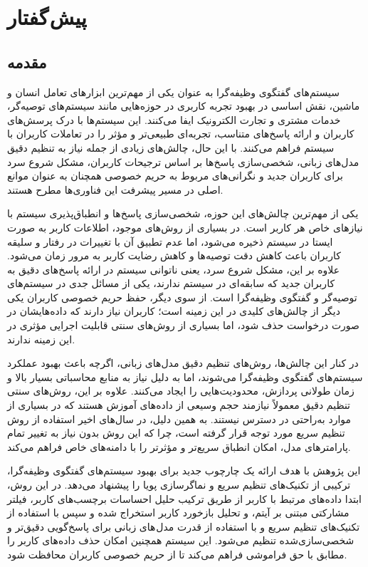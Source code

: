 
\chapter{پیش گفتار}

\section{مقدمه}

سیستم‌های گفتگوی وظیفه‌گرا به عنوان یکی از مهم‌ترین ابزارهای تعامل انسان و ماشین، نقش اساسی در بهبود تجربه کاربری در حوزه‌هایی مانند سیستم‌های توصیه‌گر، خدمات مشتری و تجارت الکترونیک ایفا می‌کنند. این سیستم‌ها با درک پرسش‌های کاربران و ارائه پاسخ‌های متناسب، تجربه‌ای طبیعی‌تر و مؤثر را در تعاملات کاربران با سیستم فراهم می‌کنند. با این حال، چالش‌های زیادی از جمله نیاز به تنظیم دقیق مدل‌های زبانی، شخصی‌سازی پاسخ‌ها بر اساس ترجیحات کاربران، مشکل شروع سرد برای کاربران جدید و نگرانی‌های مربوط به حریم خصوصی همچنان به عنوان موانع اصلی در مسیر پیشرفت این فناوری‌ها مطرح هستند.  

یکی از مهم‌ترین چالش‌های این حوزه، شخصی‌سازی پاسخ‌ها و انطباق‌پذیری سیستم با نیازهای خاص هر کاربر است. در بسیاری از روش‌های موجود، اطلاعات کاربر به صورت ایستا در سیستم ذخیره می‌شود، اما عدم تطبیق آن با تغییرات در رفتار و سلیقه کاربران باعث کاهش دقت توصیه‌ها و کاهش رضایت کاربر به مرور زمان می‌شود. علاوه بر این، مشکل شروع سرد، یعنی ناتوانی سیستم در ارائه پاسخ‌های دقیق به کاربران جدید که سابقه‌ای در سیستم ندارند، یکی از مسائل جدی در سیستم‌های توصیه‌گر و گفتگوی وظیفه‌گرا است. از سوی دیگر، حفظ حریم خصوصی کاربران یکی دیگر از چالش‌های کلیدی در این زمینه است؛ کاربران نیاز دارند که داده‌هایشان در صورت درخواست حذف شود، اما بسیاری از روش‌های سنتی قابلیت اجرایی مؤثری در این زمینه ندارند.  

در کنار این چالش‌ها، روش‌های تنظیم دقیق مدل‌های زبانی، اگرچه باعث بهبود عملکرد سیستم‌های گفتگوی وظیفه‌گرا می‌شوند، اما به دلیل نیاز به منابع محاسباتی بسیار بالا و زمان طولانی پردازش، محدودیت‌هایی را ایجاد می‌کنند. علاوه بر این، روش‌های سنتی تنظیم دقیق معمولاً نیازمند حجم وسیعی از داده‌های آموزش هستند که در بسیاری از موارد به‌راحتی در دسترس نیستند. به همین دلیل، در سال‌های اخیر استفاده از روش تنظیم سریع مورد توجه قرار گرفته است، چرا که این روش بدون نیاز به تغییر تمام پارامترهای مدل، امکان انطباق سریع‌تر و مؤثرتر را با دامنه‌های خاص فراهم می‌کند.  

این پژوهش با هدف ارائه یک چارچوب جدید برای بهبود سیستم‌های گفتگوی وظیفه‌گرا، ترکیبی از تکنیک‌های تنظیم سریع و نماگر‌سازی پویا را پیشنهاد می‌دهد. در این روش، ابتدا داده‌های مرتبط با کاربر از طریق ترکیب حلیل احساسات برچسب‌های کاربر، فیلتر مشارکتی مبتنی بر آیتم، و تحلیل بازخورد کاربر استخراج شده و سپس با استفاده از تکنیک‌های تنظیم سریع و با استفاده از قدرت مدل های زبانی برای پاسخ‌گویی دقیق‌تر و شخصی‌سازی‌شده تنظیم می‌شود. این سیستم همچنین امکان حذف داده‌های کاربر را مطابق با حق فراموشی فراهم می‌کند تا از حریم خصوصی کاربران محافظت شود.  

